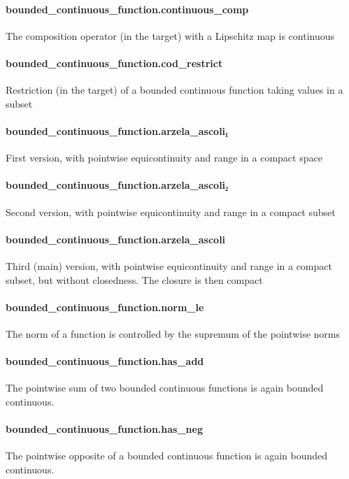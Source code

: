\documentclass{article}
\begin{document}
\paragraph{bounded\_continuous\_function.continuous\_comp}
\par
The composition operator (in the target) with a Lipschitz map is continuous
\paragraph{bounded\_continuous\_function.cod\_restrict}
\par
Restriction (in the target) of a bounded continuous function taking values in a subset
\paragraph{bounded\_continuous\_function.arzela\_ascoli₁}
\par
First version, with pointwise equicontinuity and range in a compact space
\paragraph{bounded\_continuous\_function.arzela\_ascoli₂}
\par
Second version, with pointwise equicontinuity and range in a compact subset
\paragraph{bounded\_continuous\_function.arzela\_ascoli}
\par
Third (main) version, with pointwise equicontinuity and range in a compact subset, but
without closedness. The closure is then compact
\paragraph{bounded\_continuous\_function.norm\_le}
\par
The norm of a function is controlled by the supremum of the pointwise norms
\paragraph{bounded\_continuous\_function.has\_add}
\par
The pointwise sum of two bounded continuous functions is again bounded continuous.
\paragraph{bounded\_continuous\_function.has\_neg}
\par
The pointwise opposite of a bounded continuous function is again bounded continuous.
\end{document}

